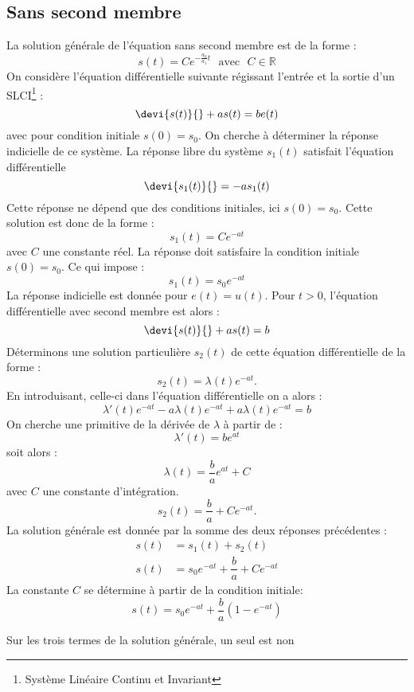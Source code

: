 \subsection{Sans second membre}
La solution générale de l'équation sans second membre est de la forme :
\[
s(t) = C e^{-\frac{a_0}{a_1}t}\,\,\,\,\text{avec}\,\,\,\,C\in\mathbb{R}
\]
On considère l'équation différentielle suivante régissant l'entrée
et la sortie d'un SLCI\footnote{Système Linéaire Continu et Invariant} :
\[
\devi{s(t)}{}+as(t)=be(t)
\]
avec pour condition initiale $s(0)=s_0$.
On cherche à déterminer la réponse indicielle de ce système.
La réponse libre du système $s_1(t)$ satisfait l'équation différentielle
\[
\devi{s_1(t)}{}=-as_1(t)
\]
Cette réponse ne dépend que des conditions initiales, ici $s(0)=s_0$.
Cette solution est donc de la forme :
\[
s_1(t)=Ce^{-at}
\]
avec $C$ une constante réel. La réponse doit satisfaire la condition 
initiale $s(0)=s_0$. Ce qui impose :
\[
s_1(t)=s_0e^{-at}
\]
La réponse indicielle est donnée pour $e(t)=u(t)$. Pour $t>0$, l'équation 
différentielle avec second membre est alors :
\[
\devi{s(t)}{}+as(t)=b
\]
Déterminons une solution particulière $s_2(t)$ de cette équation 
différentielle de la forme :
\[
s_2(t)=\lambda(t)e^{-at}.
\]
En introduisant, celle-ci dans l'équation différentielle on a alors :
\[
\lambda'(t)e^{-at}-a\lambda(t)e^{-at}+a\lambda(t)e^{-at}=b
\]
On cherche une primitive de la dérivée de $\lambda$ à partir de :
\[
\lambda'(t)=be^{at}
\]
soit alors :
\[
\lambda(t)=\dfrac{b}{a}e^{at}+C
\]
avec $C$ une constante d'intégration.
\[
s_2(t)=\dfrac{b}{a}+Ce^{-at}.
\]
La solution générale est donnée par la somme des deux réponses précédentes :
\begin{align*}
    s(t)&=s_1(t)+s_2(t)\\
    s(t)&=s_0e^{-at}+\dfrac{b}{a}+Ce^{-at}
\end{align*}
La constante $C$ se détermine à partir de la condition initiale:
\[
s(t)=s_0e^{-at}+\dfrac{b}{a}\left(1-e^{-at}\right)
\]
\begin{center}
    
\end{center}
Sur les trois termes de la solution générale, un seul est non
